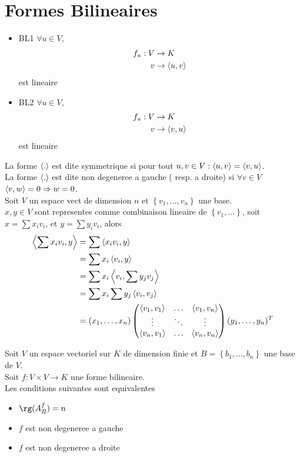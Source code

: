 \documentclass[../main.tex]{subfiles}
\begin{document}
\section{Formes Bilineaires}
\begin{defn}
	\begin{itemize}
	\item BL1 $\forall u \in V,$ 
		\begin{align*}
			f_u: V &\to K\\
			v &\to \left\langle u,v\right\rangle
		\end{align*}
		est lineaire
	
	\item BL2 $\forall u \in V,$ 
		\begin{align*}
			f_u: V &\to K\\
			v &\to \left\langle v,u\right\rangle
		\end{align*}
		est lineaire
	
	\end{itemize}
	
	
\end{defn}
La forme $\left\langle.\right\rangle$ est dite symmetrique si pour tout $u,v \in V: \left\langle u,v\right\rangle= \left\langle v,u\right\rangle$.\\
La forme $\left\langle.\right\rangle$ est dite non degeneree a gauche ( resp. a droite) si
$\forall v \in V$ $\left\langle v,w\right\rangle=0 \Rightarrow w=0$.\\
Soit $V$ un espace vect de dimension $n$ et $ \left\{ v_1, \ldots, v_n \right\} $ une base.\\
$ x,y \in V$ sont representes comme combinaison lineaire de $ \left\{ v_1, \ldots \right\} $, soit $x = \sum x_i v_i$, et $ y = \sum y_i v_i$, alors
\begin{align*}
	\left\langle \sum x_i v_i, y\right\rangle &= \sum \left\langle x_i v_i, y\right\rangle \\
				&= \sum x_i \left\langle v_i, y\right\rangle \\
				&= \sum x_i \left\langle v_i, \sum y_j v_j\right\rangle\\
				&= \sum x_i \sum y_j \left\langle v_i, v_j\right\rangle\\
				&= ( x_1, \ldots, x_n) 
				\begin{pmatrix}
					\left\langle v_1, v_1\right\rangle & \ldots & \left\langle v_1, v_n \right\rangle \\
\vdots & \ddots & \vdots \\
\left\langle v_n, v_1\right\rangle  & \ldots & \left\langle v_n,v_n\right\rangle 
				\end{pmatrix}
				( y_1, \ldots, y_n)^{T}
\end{align*}
\begin{propo}
	Soit $V$ un espace vectoriel sur $K$ de dimension finie et 
	$B= \left\{ b_1,\ldots, b_n \right\} $ une base de $V$. \\
	Soit $f: V \times V \to K$ une forme bilineaire. \\
	Les conditions suivantes sont equivalentes
	\begin{itemize}
		\item $\rg ( A_B ^{f}) = n$ 
		\item $f$ est non degeneree a gauche
		\item $f$ est non degeneree a droite
	\end{itemize}
	
\end{propo}
\end{document}
